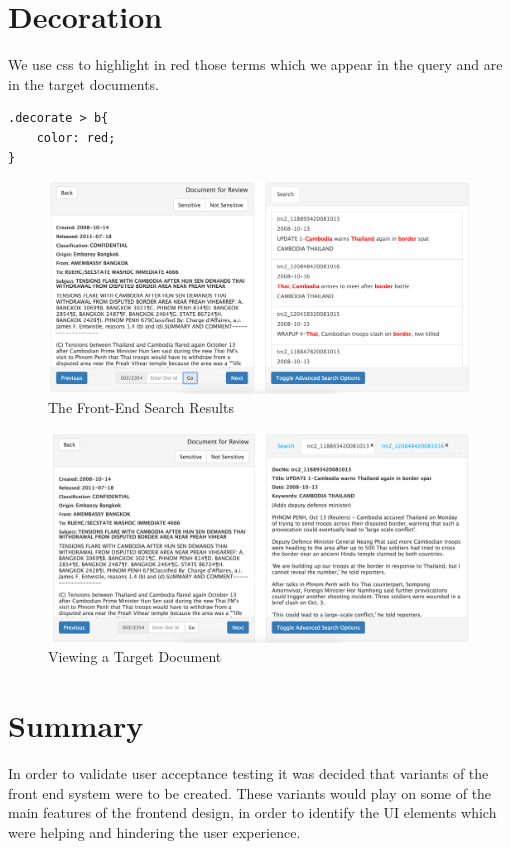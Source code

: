 \documentclass{l4proj}
\begin{document}
\section{Decoration}
We use css to highlight in red those terms which we appear in the query and are in the target documents. 
\begin{verbatim}
.decorate > b{
    color: red;
}
\end{verbatim}

\begin{figure}[H]
\centering
\includegraphics[scale=0.30]{images/searchresults}
\caption{The Front-End Search Results}
\label{relevant_results}
\end{figure}
\begin{figure}[H]
\centering
\includegraphics[scale=0.30]{images/targetdocument}
\caption{Viewing a Target Document}
\label{relevant_results}
\end{figure}

\section{Summary}
In order to validate user acceptance testing it was decided that variants of the front end system were to be created. These variants would play on some of the main features of the frontend design, in order to identify the UI elements which were helping and hindering the user experience.
\end{document}
